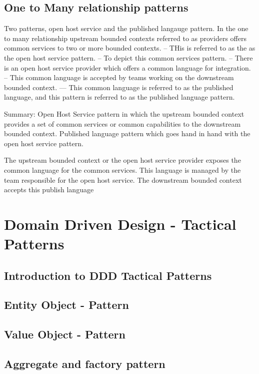 \section{One to Many relationship patterns}

Two patterns, open host service and the published langauge pattern.
In the one to many relationship upstream bounded contexts referred to as providers offers common services to two or more bounded contexts.
-- THis is referred to as the as the open host service pattern.
-- To depict this common services pattern.
-- There is an open host service provider which offers a common language for integration.
-- This common language is accepted by teams working on the downstream bounded context.
--- This common language is referred to as the published language, and this pattern is referred to as the published language pattern.

Summary:
Open Host Service pattern in which the upstream bounded context provides a set of common services or common capabilities to the downstream bounded context.
Published language pattern which goes hand in hand with the open host service pattern.

The upstream bounded context or the open host service provider exposes the common language for the common services.
This language is managed by the team responsible for the open host service.
The downstream bounded context accepts this publish language

\chapter{Domain Driven Design - Tactical Patterns}

\section{Introduction to DDD Tactical Patterns}

\section{Entity Object - Pattern}

\section{Value Object - Pattern}

\section{Aggregate and factory pattern}

